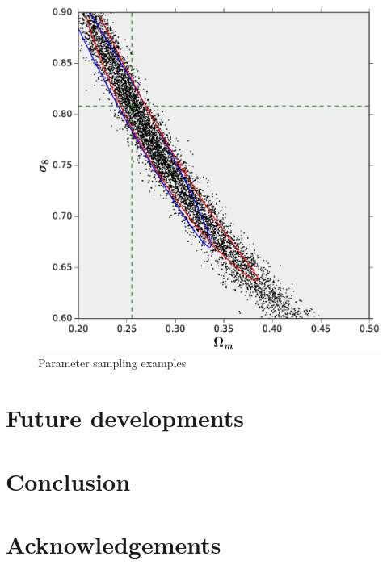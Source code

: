 \documentclass[reprint,aps,prd,superscriptaddress,showkeys,showpacs]{revtex4-1}
\begin{document}
\begin{figure}
\includegraphics[scale=0.4]{Figures/parameter_sampling.eps}
\caption{Parameter sampling examples}
\label{samplingfig}
\end{figure}


\section{Future developments}


\section{Conclusion}

 

\section*{Acknowledgements}

\end{document}
